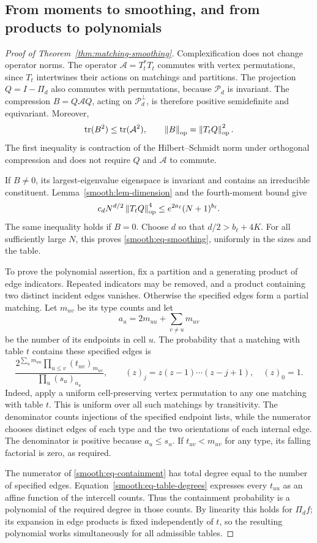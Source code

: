 \subsection{From moments to smoothing, and from products to polynomials}

\begin{proof}[Proof of Theorem~\ref{thm:matching-smoothing}]
Complexification does not change operator norms.  The operator
\(\mathcal A=T_t^*T_t\) commutes with vertex permutations, since
\(T_t\) intertwines their actions on matchings and partitions.
The projection \(Q=I-\Pi_d\) also commutes with permutations,
because \(\mathcal P_d\) is invariant.  The compression
\(B=Q\mathcal A Q\), acting on \(\mathcal P_d^\perp\), is therefore
positive semidefinite and equivariant.  Moreover,
\[
 \operatorname{tr}(B^2)\le\operatorname{tr}(\mathcal A^2),\qquad
 \left\lVert B\right\rVert_{\mathrm{op}}=\left\lVert T_tQ\right\rVert_{\mathrm{op}}^2.
\]
The first inequality is contraction of the Hilbert--Schmidt norm
under orthogonal compression and does not require \(Q\) and
\(\mathcal A\) to commute.

If \(B\ne0\), its largest-eigenvalue eigenspace is invariant and
contains an irreducible constituent.  Lemma~\ref{smooth:lem-dimension}
and the fourth-moment bound give
\[
 c_dN^{d/2}\left\lVert T_tQ\right\rVert_{\mathrm{op}}^4
 \le e^{2a_\ell}(N+1)^{b_\ell}.
\]
The same inequality holds if \(B=0\).  Choose \(d\) so that
\(d/2>b_\ell+4K\).  For all sufficiently large \(N\), this proves
\eqref{smooth:eq-smoothing}, uniformly in the sizes and the table.

To prove the polynomial assertion, fix a partition and a generating
product of edge indicators.  Repeated indicators may be removed,
and a product containing two distinct incident edges vanishes.
Otherwise the specified edges form a partial matching.  Let
\(m_{uv}\) be its type counts and let
\[
 a_u=2m_{uu}+\sum_{v\ne u}m_{uv}
\]
be the number of its endpoints in cell \(u\).  The probability
that a matching with table \(t\) contains these specified edges is
\begin{equation}\label{smooth:eq-containment}
 \frac{2^{\sum_um_{uu}}\prod_{u\le v}(t_{uv})_{m_{uv}}}
      {\prod_u(s_u)_{a_u}},
 \qquad
 (z)_j=z(z-1)\cdots(z-j+1),\quad (z)_0=1.
\end{equation}
Indeed, apply a uniform cell-preserving vertex permutation to any
one matching with table \(t\).  This is uniform over all such
matchings by transitivity.  The denominator counts injections of
the specified endpoint lists, while the numerator chooses distinct
edges of each type and the two orientations of each internal edge.
The denominator is positive because \(a_u\le s_u\).
If \(t_{uv}<m_{uv}\) for any type, its falling factorial is zero,
as required.

The numerator of \eqref{smooth:eq-containment} has total degree equal to
the number of specified edges.  Equation~\eqref{smooth:eq-table-degrees}
expresses every \(t_{uu}\) as an affine function of the intercell
counts.  Thus the containment probability is a polynomial of the
required degree in those counts.  By linearity this holds for
\(\Pi_df\); its expansion in edge products is fixed independently
of \(t\), so the resulting polynomial works simultaneously for all
admissible tables.
\end{proof}


